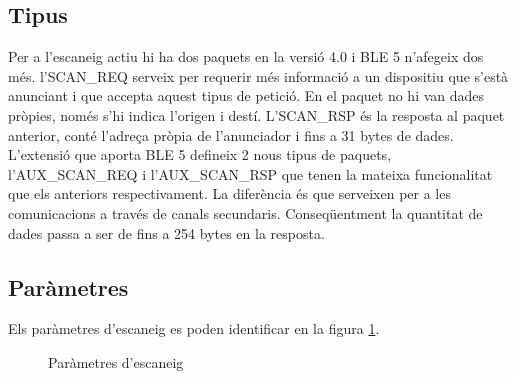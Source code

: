 \subsection{Tipus}
Per a l'escaneig actiu hi ha dos paquets en la versió 4.0 i BLE 5 n'afegeix dos més.
l'SCAN\_REQ serveix per requerir més informació a un dispositiu que s'està anunciant i que accepta aquest tipus de petició.
En el paquet no hi van dades pròpies, només s'hi indica l'origen i destí.
L'SCAN\_RSP és la resposta al paquet anterior, conté l'adreça pròpia de l'anunciador i fins a 31 bytes de dades.
L'extensió que aporta BLE 5 defineix 2 nous tipus de paquets, l'AUX\_SCAN\_REQ i l'AUX\_SCAN\_RSP que tenen la mateixa funcionalitat que els anteriors respectivament.
La diferència és que serveixen per a les comunicacions a través de canals secundaris.
Conseqüentment la quantitat de dades passa a ser de fins a 254 bytes en la resposta.

\subsection{Paràmetres}
Els paràmetres d'escaneig es poden identificar en la figura \ref{fig:escaneig_canals}.

\begin{figure}[!h]
	\begin{center}
		\begin{subfigmatrix}{1}
		\end{subfigmatrix}
	\end{center}
	\caption{Paràmetres d'escaneig \cite{advertisment_params} }
	\label{fig:escaneig_canals}
\end{figure}

